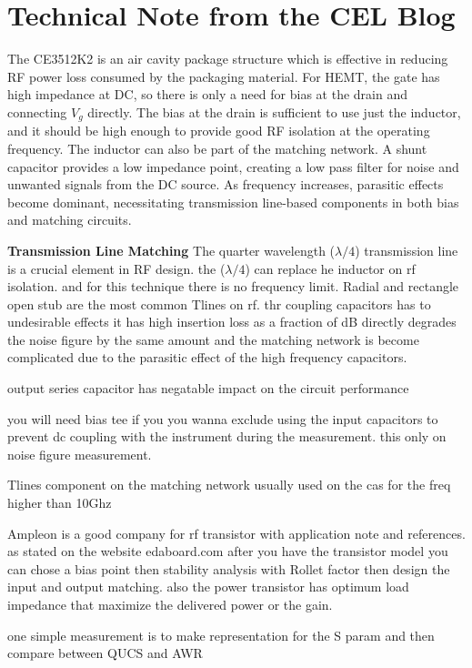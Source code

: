 \documentclass{article}
\begin{document}
\section{Technical Note from the CEL Blog}
The CE3512K2 is an air cavity package structure which is effective in reducing RF power loss consumed by the packaging material. For HEMT, the gate has high impedance at DC, so there is only a need for bias at the drain and connecting \( V_g \) directly. The bias at the drain is sufficient to use just the inductor, and it should be high enough to provide good RF isolation at the operating frequency. The inductor can also be part of the matching network. A shunt capacitor provides a low impedance point, creating a low pass filter for noise and unwanted signals from the DC source. As frequency increases, parasitic effects become dominant, necessitating transmission line-based components in both bias and matching circuits.

\textbf{Transmission Line Matching}
The quarter wavelength (\( \lambda /4 \)) transmission line is a crucial element in RF design.
the (\(\lambda/4 \)) can replace he inductor on rf isolation. and for this technique there is no frequency limit.
Radial and rectangle open stub are the most common Tlines on rf.
thr coupling capacitors has to undesirable effects it has high insertion loss as a fraction of dB directly degrades the
noise figure by the same amount and the matching network is become complicated due to the parasitic effect of the high 
frequency capacitors.

output series capacitor has negatable impact on the circuit performance 

you will need bias tee if you you wanna exclude using the input capacitors to prevent dc coupling with the instrument during the measurement.
this only on noise figure measurement. 

Tlines component on the matching network usually used on the cas for the freq higher than  10Ghz

Ampleon is a good company for rf transistor with application note and references.
as stated on the website  edaboard.com   after you have the transistor model you can chose a bias point then stability analysis 
with Rollet factor then design the input and output matching. also the power transistor has optimum load impedance
that maximize the delivered power or the gain.

one simple measurement is to make representation for the S param and then compare between QUCS and AWR 
\end{document}
